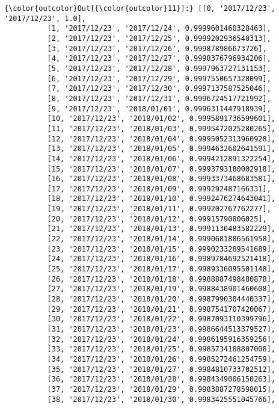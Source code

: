 \documentclass[11pt]{article}
\begin{document}
\begin{Verbatim}[commandchars=\\\{\}]
{\color{outcolor}Out[{\color{outcolor}11}]:} [[0, '2017/12/23', '2017/12/23', 1.0],
          [1, '2017/12/23', '2017/12/24', 0.9999601460328463],
          [2, '2017/12/23', '2017/12/25', 0.9999202936540313],
          [3, '2017/12/23', '2017/12/26', 0.999878986673726],
          [4, '2017/12/23', '2017/12/27', 0.9998376796934206],
          [5, '2017/12/23', '2017/12/28', 0.9997963727131153],
          [6, '2017/12/23', '2017/12/29', 0.9997550657328099],
          [7, '2017/12/23', '2017/12/30', 0.9997137587525046],
          [8, '2017/12/23', '2017/12/31', 0.9996724517721992],
          [9, '2017/12/23', '2018/01/01', 0.9996311447918939],
          [10, '2017/12/23', '2018/01/02', 0.9995891736599601],
          [11, '2017/12/23', '2018/01/03', 0.9995472025280265],
          [12, '2017/12/23', '2018/01/04', 0.9995052313960928],
          [13, '2017/12/23', '2018/01/05', 0.9994632602641591],
          [14, '2017/12/23', '2018/01/06', 0.9994212891322254],
          [15, '2017/12/23', '2018/01/07', 0.9993793180002918],
          [16, '2017/12/23', '2018/01/08', 0.9993373468683581],
          [17, '2017/12/23', '2018/01/09', 0.999292487166331],
          [18, '2017/12/23', '2018/01/10', 0.9992476274643041],
          [19, '2017/12/23', '2018/01/11', 0.999202767762277],
          [20, '2017/12/23', '2018/01/12', 0.99915790806025],
          [21, '2017/12/23', '2018/01/13', 0.9991130483582229],
          [22, '2017/12/23', '2018/01/14', 0.9990681886561958],
          [23, '2017/12/23', '2018/01/15', 0.9990233289541689],
          [24, '2017/12/23', '2018/01/16', 0.9989784692521418],
          [25, '2017/12/23', '2018/01/17', 0.9989336095501148],
          [26, '2017/12/23', '2018/01/18', 0.9988887498480878],
          [27, '2017/12/23', '2018/01/19', 0.9988438901460608],
          [28, '2017/12/23', '2018/01/20', 0.9987990304440337],
          [29, '2017/12/23', '2018/01/21', 0.9987541707420067],
          [30, '2017/12/23', '2018/01/22', 0.9987093110399796],
          [31, '2017/12/23', '2018/01/23', 0.9986644513379527],
          [32, '2017/12/23', '2018/01/24', 0.9986195916359256],
          [33, '2017/12/23', '2018/01/25', 0.9985734188807008],
          [34, '2017/12/23', '2018/01/26', 0.9985272461254759],
          [35, '2017/12/23', '2018/01/27', 0.9984810733702512],
          [36, '2017/12/23', '2018/01/28', 0.9984349006150263],
          [37, '2017/12/23', '2018/01/29', 0.9983887278598015],
          [38, '2017/12/23', '2018/01/30', 0.9983425551045766],

\end{Verbatim}
\end{document}
